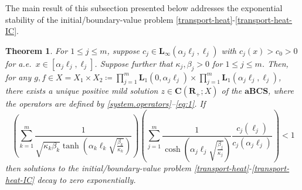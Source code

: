 \documentclass[a4paper,11pt,reqno]{amsart}
\def\R{\mathbf{R}}
\newtheorem{theorem}{Theorem}[section]
\theoremstyle{plain}
\numberwithin{equation}{section}
\begin{document}
The main result of this subsection presented below addresses the exponential stability of the initial/boundary-value problem \eqref{transport-heat}-\eqref{transport-heat-IC}.
\begin{theorem}
For $1 \le j\le m$, suppose $c_j\in \bm{L}_{\infty}(\alpha_j\ell_{j}, \ell_{j})$ with $c_j(x) >c_0> 0$ for a.e.\ $x\in [\alpha_j\ell_j, \ell_j]$. Suppose further that $\kappa_j, \beta_j > 0$ for $1 \le j\le m$. Then, for any $g,f\in X = X_1\times X_2\coloneqq \prod_{j=1}^m \bm{L}_1(0,\alpha_j\ell_j) \times \prod_{j=1}^m \bm{L}_1(\alpha_j\ell_j,\ell_j)$, there exists a unique positive mild solution $z \in \bm{C}(\R_+;X)$ of the $\mathbf{aBCS}$, where the operators are defined by \eqref{system.operators}--\eqref{eq:1}. If
\begin{equation}\label{stability-cond}
\left( \sum_{k=1}^m \frac{1}{\sqrt{\kappa_k \beta_k} \tanh(\alpha_k \ell_k \sqrt{\frac{\beta_k}{\kappa_k}})} \right)
\left( \sum_{j=1}^m \frac{1}{\cosh(\alpha_j \ell_j \sqrt{\frac{\beta_j}{\kappa_j}})} \frac{c_j(\ell_j)}{c_j(\alpha_j \ell_j)} \right) < 1
\end{equation} 
then solutions to the initial/boundary-value problem \eqref{transport-heat}-\eqref{transport-heat-IC} decay to zero exponentially.
\end{theorem}
\end{document}
